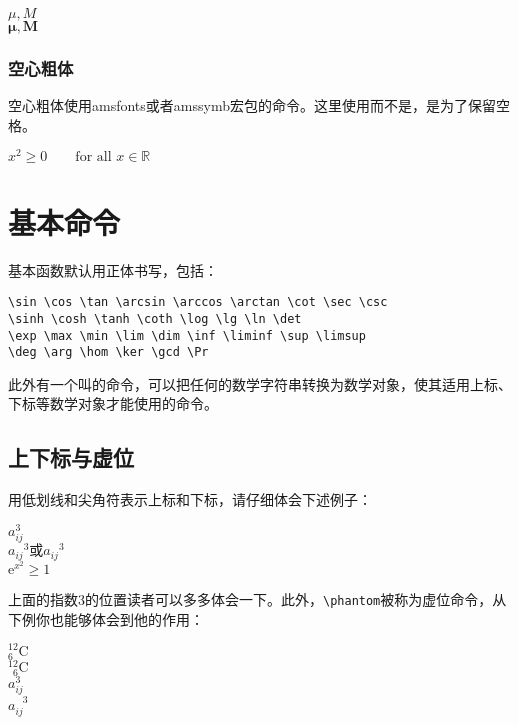 {\begin{codeshow}
$\mu,M$\\
$\boldsymbol{\mu},
\boldsymbol{M}$ \\
\end{codeshow}

\subsubsection{空心粗体}
空心粗体使用amsfonts或者amssymb宏包的\latexline{\\mathbb}命令。这里使用\latexline{\\textrm}而不是\latexline{\\mathrm}，是为了保留空格。

\begin{codeshow}
$x^2 \geq 0 \qquad
\textrm{for all }x\in\mathbb{R}$
\end{codeshow}

\section{基本命令}
基本函数默认用正体书写，包括：
\begin{verbatim}
\sin \cos \tan \arcsin \arccos \arctan \cot \sec \csc
\sinh \cosh \tanh \coth \log \lg \ln \det
\exp \max \min \lim \dim \inf \liminf \sup \limsup
\deg \arg \hom \ker \gcd \Pr
\end{verbatim}

此外有一个叫\latexline{\\mathop}的命令，可以把任何的数学字符串转换为数学对象，使其适用上标、下标等数学对象才能使用的命令。

\subsection{上下标与虚位}
用低划线和尖角符表示上标和下标，请仔细体会下述例子：

\begin{codeshow}
$a^3_{ij}$ \\
${a_{ij}}^3\text{或}a_{ij}{}^3$\\
$\mathrm{e}^{x^2}\geq 1$
\end{codeshow}

上面的指数3的位置读者可以多多体会一下。此外，\verb|\phantom|被称为虚位命令，从下例你也能够体会到他的作用：

\begin{codeshow}
${}^{12}_{6}\mathrm{C}$ \\
${}^{12}_{\phantom{1}6}
\mathrm{C}$ \\
$a^3_{ij}$ \\
$a^{\phantom{ij}3}_{ij}$
\end{codeshow}

}

